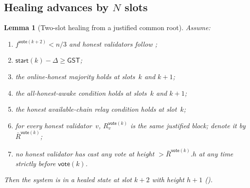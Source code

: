 \ifx\litemode\undefined\documentclass{article}\fi
\newcommand{\start}{\mathsf{start}}
\newcommand{\vote}{\mathsf{vote}}
\newcommand{\comm}[1]{\bar{#1}}
\newcommand{\getConfirmed}{\textsf{getConfirmed}\xspace}
\theoremstyle{plain}
\newtheorem{lemma}{Lemma}
\theoremstyle{definition}
\theoremstyle{remark}
\newcommand{\GST}{\ensuremath{\mathsf{GST}}}
\newcommand{\OHM}{online-honest majority\xspace}
\newcommand{\HAR}{honest available-chain relay\xspace}
\newcommand{\AHA}{all-honest-awake\xspace}
\begin{document}
\subsection{Healing advances by $N$ slots}\label{rev:sec:healing-advances}


\begin{lemma}[Two-slot healing from a justified common root]\label{rev:lem:healing-from-justified}
Assume:
\begin{enumerate}
  \item\label{rev:hfj:f} $f^{\vote(k+2)} < n/3$ and honest validators follow ;
  \item\label{rev:hfj:sync} $\start(k) - \Delta \geq \GST$;
  \item\label{rev:hfj:ohm} the \OHM holds at slots~$k$ and $k+1$;
  \item\label{rev:hfj:aha} the \AHA condition holds at slots~$k$ and $k+1$;
  \item\label{rev:hfj:har} the \HAR condition holds at slot~$k$;
  \item\label{rev:hfj:r} for every honest validator~$v$, $R_v^{\vote(k)}$ is the same justified block; denote it by $\comm{R}^{\vote(k)}$;
  \item\label{rev:hfj:nh} no honest validator has cast any vote at height $> \comm{R}^{\vote(k)}.h$ at any time strictly before $\vote(k)$.
\end{enumerate}
Then the system is in a healed state at slot $k+2$ with height $h+1$ ().
\end{lemma}
\end{document}
